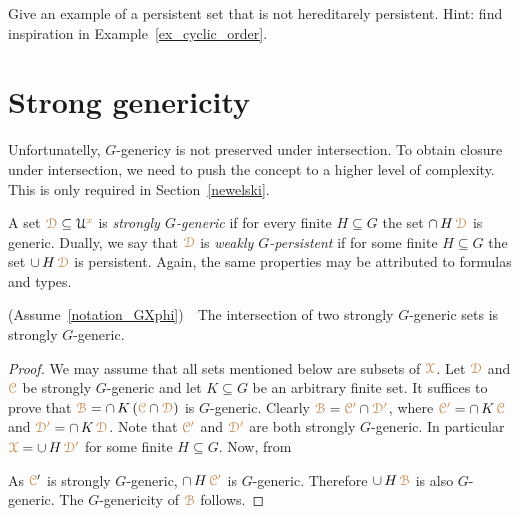 \begin{exercise}
  Give an example of a persistent set that is not hereditarely persistent.
  Hint: find inspiration in Example~\ref{ex_cyclic_order}.
\end{exercise}

\section{Strong genericity}\label{strong_genericity}\label{strong_genericity}

Unfortunatelly, $G$-genericy is not preserved under intersection.
To obtain closure under intersection, we need to push the concept to a higher level of complexity.
This is only required in Section~\ref{newelski}.



A set ${\color{brown}\EuScript D}\subseteq\EuScript U^{\color{brown} x}$ is \emph{strongly $G$-generic\/} if for every finite $H\subseteq G$ the set $\cap\,H\,{\color{brown}\EuScript D}$ is generic.
Dually, we say that ${\color{brown}\EuScript D}$ is \emph{weakly $G$-persistent\/} if for some finite $H\subseteq G$ the set $\cup\,H\,{\color{brown}\EuScript D}$ is persistent.
Again, the same properties may be attributed to formulas and types.

\begin{lemma}\label{lem_strongly_generic}
  (Assume~\ref{notation_GXphi})\ \  
  The intersection of two strongly $G$-generic sets is strongly $G$-generic.
\end{lemma}

\begin{proof}
  We may assume that all sets mentioned below are subsets of ${\color{brown}\EuScript X}$.
  Let ${\color{brown}\EuScript D}$ and ${\color{brown}\EuScript C}$ be strongly $G$-generic and let $K\subseteq G$ be an arbitrary finite set.
  It suffices to prove that ${\color{brown}\EuScript B}=\cap\, K\,({\color{brown}\EuScript C}\cap{\color{brown}\EuScript D})$ is $G$-generic. 
  Clearly ${\color{brown}\EuScript B}={\color{brown}\EuScript C'}\cap{\color{brown}\EuScript D'}$, where ${\color{brown}\EuScript C'}=\cap\, K\,{\color{brown}\EuScript C}$ and ${\color{brown}\EuScript D'}=\cap\, K\,{\color{brown}\EuScript D}$.
  Note that ${\color{brown}\EuScript C'}$ and ${\color{brown}\EuScript D'}$ are both strongly $G$-generic.
  In particular ${\color{brown}\EuScript X}=\cup\,H\,\color{brown}\EuScript D'$ for some finite $H\subseteq G$.
  Now, from
  

  
  
  
  As ${{\color{brown}\EuScript C}'}$ is strongly $G$-generic, $\cap\, H\,{\color{brown}\EuScript C'}$ is $G$-generic.
  Therefore $\cup\,H\,{\color{brown}\EuScript B}$ is also $G$-generic.
  The $G$-genericity of ${\color{brown}\EuScript B}$ follows.
\end{proof}

